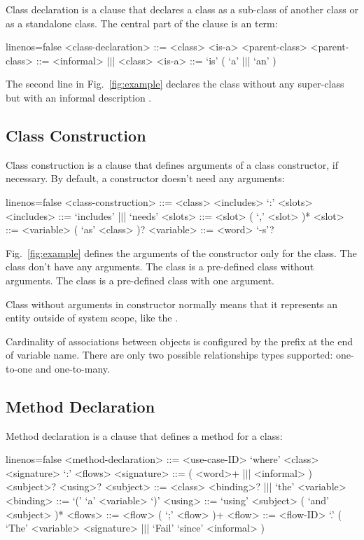 \documentclass[sigplan,10pt]{acmart}
\begin{document}
Class declaration is a clause that declares a class as a sub-class of
another class or as a standalone class. The central part of the clause is
an  term:

\begin{ffcode*}{linenos=false}
<class-declaration> ::= <class>
  <is-a> <parent-class>
<parent-class> ::= <informal> |$\vert$| <class>
<is-a> ::= `is' ( `a' |$\vert$| `an' )
\end{ffcode*}

The second line in Fig.~\ref{fig:example} declares the class 
without any super-class but with an informal description
.

\subsection{Class Construction}

Class construction is a clause that defines arguments of a class
constructor, if necessary. By default, a constructor doesn't need any
arguments:

\begin{ffcode*}{linenos=false}
<class-construction> ::= <class> <includes>
  `:' <slots>
<includes> ::= `includes' |$\vert$| `needs'
<slots> ::= <slot> ( `,' <slot> )*
<slot> ::= <variable> ( `as' <class> )?
<variable> ::= <word> `-s'?
\end{ffcode*}

Fig.~\ref{fig:example} defines the arguments of the constructor only for
the  class. The class  don't have any arguments. The class
 is a pre-defined class without arguments. The class  is a
pre-defined class with one argument.

Class without arguments in constructor normally means that it represents an
entity outside of system scope, like the .

Cardinality of associations between objects is configured by the 
prefix at the end of variable name. There are only
two possible relationships types supported: one-to-one and one-to-many.

\subsection{Method Declaration}

Method declaration is a clause that defines a method for a class:

\begin{ffcode*}{linenos=false}
<method-declaration> ::= <use-case-ID> `where'
<class> <signature> `:' <flows>
<signature> ::= ( <word>+ |$\vert$| <informal> )
  <subject>? <using>?
<subject> ::= <class> <binding>?
  |$\vert$| `the' <variable>
<binding> ::= `(' `a' <variable> `)'
<using> ::= `using' <subject>
  ( `and' <subject> )*
<flows> ::= <flow> ( `;' <flow> )+
<flow> ::= <flow-ID> `.'
  (
    `The' <variable> <signature>
    |$\vert$|
    `Fail' `since' <informal>
  )
\end{ffcode*}
\end{document}
